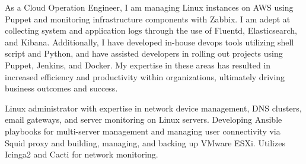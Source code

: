 \documentclass[8pt,a4paper, withhyper]{altacv}
\begin{document}
\begin{paracol}{2}
As a Cloud Operation Engineer, I am managing Linux instances on AWS using Puppet and monitoring infrastructure components with Zabbix. I am adept at collecting system and application logs through the use of Fluentd, Elasticsearch, and Kibana. Additionally, I have developed in-house devops tools utilizing shell script and Python, and have assisted developers in rolling out projects using Puppet, Jenkins, and Docker. My expertise in these areas has resulted in increased efficiency and productivity within organizations, ultimately driving business outcomes and success.
\divider

Linux administrator with expertise in network device management, DNS clusters, email gateways, and server monitoring on Linux servers. Developing Ansible playbooks for multi-server management and managing user connectivity via Squid proxy and building, managing, and backing up VMware ESXi. Utilizes Icinga2 and Cacti for network monitoring.


\switchcolumn



\divider\smallskip


\divider\smallskip


\divider\smallskip



\divider


\medskip






\end{paracol}
\end{document}

